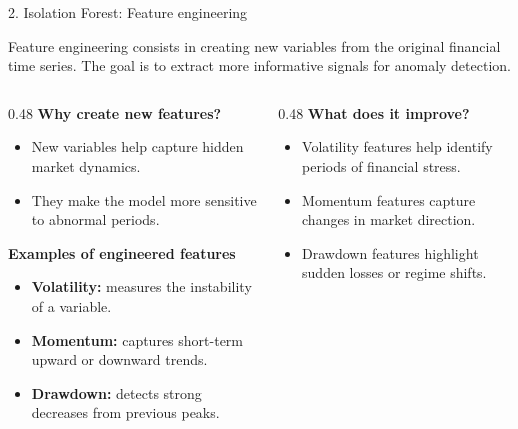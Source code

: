 \documentclass[10pt,aspectratio=169]{beamer}
\begin{document}
\begin{frame}{2. Isolation Forest: Feature engineering}

\small

Feature engineering consists in creating new variables from the original financial time series.
The goal is to extract more informative signals for anomaly detection.

\vspace{0.35cm}

\begin{columns}[T,onlytextwidth]

\begin{column}{0.48\textwidth}
{\bfseries Why create new features?}

\vspace{0.15cm}

\begin{itemize}
    \footnotesize

    \item New variables help capture hidden market dynamics.
    \item They make the model more sensitive to abnormal periods.
\end{itemize}

\vspace{0.25cm}

{\bfseries Examples of engineered features}

\vspace{0.15cm}

\begin{itemize}
    \footnotesize
    \item \textbf{Volatility:} measures the instability of a variable.
    \item \textbf{Momentum:} captures short-term upward or downward trends.
    \item \textbf{Drawdown:} detects strong decreases from previous peaks.
\end{itemize}

\end{column}

\begin{column}{0.48\textwidth}
{\bfseries What does it improve?}

\vspace{0.15cm}

\begin{itemize}
    \footnotesize
    \item Volatility features help identify periods of financial stress.
    \item Momentum features capture changes in market direction.
    \item Drawdown features highlight sudden losses or regime shifts.
\end{itemize}


\end{column}
\end{columns}
\end{frame}
\end{document}

